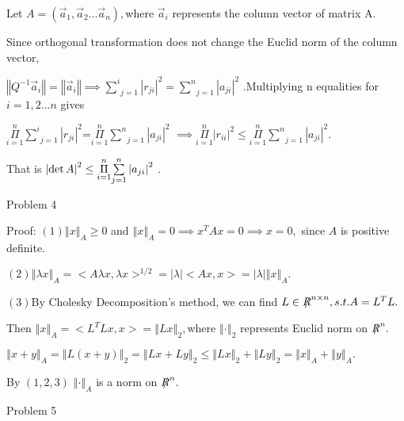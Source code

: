 \documentclass{article}
\begin{document}
Let $A=\left( \vec{a}_{1},\vec{a}_{2}...\vec{a}_{n}\right) ,$where $\vec{a}%
_{i}$ represents the column vector of matrix A.

Since orthogonal transformation does not change the Euclid norm of the
column vector,

$\left\Vert Q^{-1}\vec{a}_{i}\right\Vert =\left\Vert \vec{a}_{i}\right\Vert
\implies \underset{j=1}{\overset{i}{\sum }}\left\vert r_{ji}\right\vert ^{2}=%
\underset{j=1}{\overset{n}{\sum }}\left\vert a_{ji}\right\vert ^{2}$
.Multiplying n equalities for $i=1,2...n$ gives

$\underset{i=1}{\overset{n}{\Pi }}\underset{j=1}{\overset{i}{\sum }}%
\left\vert r_{ji}\right\vert ^{2}$=$\underset{i=1}{\overset{n}{\Pi }}%
\underset{j=1}{\overset{n}{\sum }}\left\vert a_{ji}\right\vert ^{2}$ $%
\implies \underset{i=1}{\overset{n}{\Pi }}\left\vert r_{ii}\right\vert
^{2}\leq \underset{i=1}{\overset{n}{\Pi }}\underset{j=1}{\overset{n}{\sum }}%
\left\vert a_{ji}\right\vert ^{2}.$

That is $\left\vert \det A\right\vert ^{2}\leq \underset{i=1}{\overset{n}{%
\Pi }}\underset{j=1}{\overset{n}{\sum }}\left\vert a_{ji}\right\vert ^{2}$ .


Problem 4

Proof: $\left( 1\right) \left\Vert x\right\Vert _{A}\geq 0$ and $\left\Vert
x\right\Vert _{A}=0\implies x^{T}Ax=0\implies x=0,$ since $A$ is positive
definite.

$\left( 2\right) \left\Vert \lambda x\right\Vert _{A}=<A\lambda x,\lambda
x>^{1/2}=\left\vert \lambda \right\vert <Ax,x>=\left\vert \lambda
\right\vert \left\Vert x\right\Vert _{A}.$

$\left( 3\right) $By Cholesky Decomposition's method, we can find $L\in \NEG%
{R}^{n\times n},s.t.A=L^{T}L.$

Then $\left\Vert x\right\Vert _{A}=<L^{T}Lx,x>=\left\Vert Lx\right\Vert
_{2}, $where $\left\Vert \cdot \right\Vert _{2}$ represents Euclid norm on $%
\NEG{R}^{n}.$

$\left\Vert x+y\right\Vert _{A}=\left\Vert L\left( x+y\right) \right\Vert
_{2}=\left\Vert Lx+Ly\right\Vert _{2}\leq \left\Vert Lx\right\Vert
_{2}+\left\Vert Ly\right\Vert _{2}=\left\Vert x\right\Vert _{A}+\left\Vert
y\right\Vert _{A}.$

By $\left( 1,2,3\right) $ $\left\Vert \cdot \right\Vert _{A}$ is a norm on $%
\NEG{R}^{n}.$


\bigskip Problem 5
\end{document}
